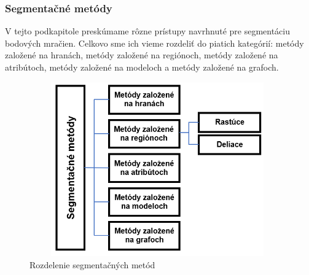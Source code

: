 \subsubsection{Segmentačné metódy}
\noindent V tejto podkapitole preskúmame rôzne prístupy navrhnuté pre segmentáciu bodových mračien. Celkovo sme ich vieme rozdeliť do piatich kategórií: metódy založené na hranách, metódy založené na regiónoch, metódy založené na atribútoch, metódy založené na modeloch a metódy založené na grafoch.
\begin{figure}[!htbp]
  \centering
  \includegraphics[width=11cm,height=7.5cm]{img/segmentation_methods.png}
  \caption{Rozdelenie segmentačných metód}
  \label{segmentation_methods}
\end{figure}
